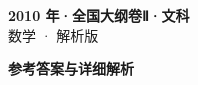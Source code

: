 \documentclass[zihao=-4, a4paper]{ctexart}
\begin{document}
\begin{center}
  {\Large\bfseries 2010 年·全国大纲卷Ⅱ·文科}\\[4pt]
  {\large 数学 · 解析版}
\end{center}
\medskip
{}

\clearpage
{}
\begin{center}{\Large\bfseries 参考答案与详细解析}\end{center}
\medskip

\end{document}
